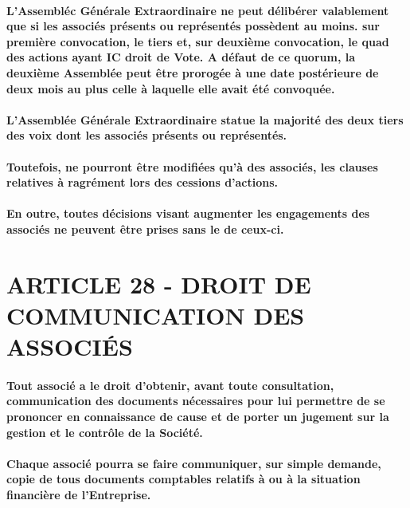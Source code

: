 \documentclass[a4paper, 11pt]{article}
\begin{document}
\paragraph{
  L'Assembléc Générale Extraordinaire ne peut délibérer valablement que si les associés présents ou représentés possèdent au moins. sur première convocation, le tiers et, sur deuxième convocation, le quad des actions ayant IC droit de Vote. A défaut de ce quorum, la deuxième Assemblée peut être prorogée à une date postérieure de deux mois au plus celle à laquelle elle avait été convoquée.
}

\paragraph{
  L'Assemblée Générale Extraordinaire statue la majorité des deux tiers des voix dont les associés présents ou représentés.
}

\paragraph{
  Toutefois, ne pourront être modifiées qu'à des associés, les clauses relatives à ragrément lors des cessions d'actions.
}

\paragraph{
  En outre, toutes décisions visant augmenter les engagements des associés ne peuvent être prises sans le de ceux-ci.
}

\section*{ARTICLE 28 - DROIT DE COMMUNICATION DES ASSOCIÉS}

\paragraph{
  Tout associé a le droit d'obtenir, avant toute consultation, communication des documents nécessaires pour lui permettre de se prononcer en connaissance de cause et de porter un jugement sur la gestion et le contrôle de la Société.
}

\paragraph{
  Chaque associé pourra se faire communiquer, sur simple demande, copie de tous documents comptables relatifs à ou à la situation financière de l'Entreprise.
}
\end{document}

